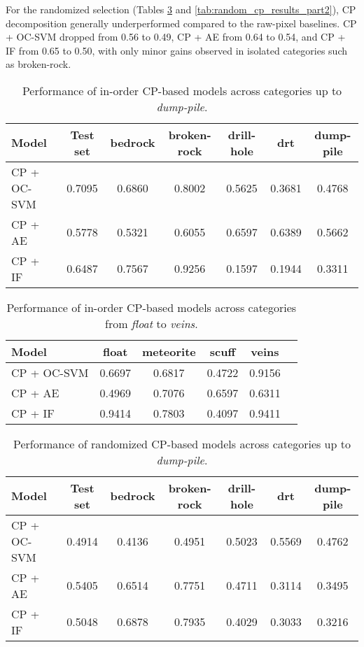 \documentclass[11pt]{article}
\begin{document}
For the randomized selection (Tables \ref{tab:random_cp_results_part1} and \ref{tab:random_cp_results_part2}), CP decomposition generally underperformed compared to the raw-pixel baselines. CP + OC-SVM dropped from 0.56 to 0.49, CP + AE from 0.64 to 0.54, and CP + IF from 0.65 to 0.50, with only minor gains observed in isolated categories such as broken-rock.  

\begin{table}[h!]
\centering
\begin{tabular}{lcccccc}
\hline
\textbf{Model} & \textbf{Test set} & \textbf{bedrock} & \textbf{broken-rock} & \textbf{drill-hole} & \textbf{drt} & \textbf{dump-pile} \\
\hline
CP + OC-SVM & 0.7095 & 0.6860 & 0.8002 & 0.5625 & 0.3681 & 0.4768 \\
CP + AE     & 0.5778 & 0.5321 & 0.6055 & 0.6597 & 0.6389 & 0.5662 \\
CP + IF     & 0.6487 & 0.7567 & 0.9256 & 0.1597 & 0.1944 & 0.3311 \\
\hline
\end{tabular}
\caption{Performance of in-order CP-based models across categories up to \textit{dump-pile}.}
\label{tab:inOrder_cp_results_part1}
\end{table}

\begin{table}[h!]
\centering
\begin{tabular}{lccccc}
\hline
\textbf{Model} & \textbf{float} & \textbf{meteorite} & \textbf{scuff} & \textbf{veins} \\
\hline
CP + OC-SVM & 0.6697 & 0.6817 & 0.4722 & 0.9156 \\
CP + AE     & 0.4969 & 0.7076 & 0.6597 & 0.6311 \\
CP + IF     & 0.9414 & 0.7803 & 0.4097 & 0.9411 \\
\hline
\end{tabular}
\caption{Performance of in-order CP-based models across categories from \textit{float} to \textit{veins}.}
\label{tab:inOrder_cp_results_part2}
\end{table}

\begin{table}[h!]
\centering
\begin{tabular}{lcccccc}
\hline
\textbf{Model} & \textbf{Test set} & \textbf{bedrock} & \textbf{broken-rock} & \textbf{drill-hole} & \textbf{drt} & \textbf{dump-pile} \\
\hline
CP + OC-SVM & 0.4914 & 0.4136 & 0.4951 & 0.5023 & 0.5569 & 0.4762 \\
CP + AE     & 0.5405 & 0.6514 & 0.7751 & 0.4711 & 0.3114 & 0.3495 \\
CP + IF     & 0.5048 & 0.6878 & 0.7935 & 0.4029 & 0.3033 & 0.3216 \\
\hline
\end{tabular}
\caption{Performance of randomized CP-based models across categories up to \textit{dump-pile}.}
\label{tab:random_cp_results_part1}
\end{table}
\end{document}
